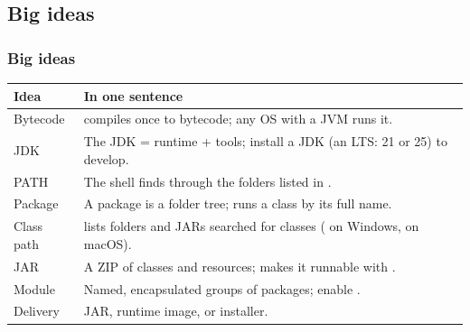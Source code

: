 \documentclass[aspectratio=169,10pt,compress]{beamer}
\begin{document}
\subsection[Ideas]{Big ideas}




\begin{frame}[t,fragile] \frametitle{Big ideas}
  \small
  \begin{tabular}{@{}L{0.22\textwidth}L{0.71\textwidth}@{}}
    \toprule
    \textbf{Idea} & \textbf{In one sentence} \\
    \midrule
    Bytecode        &  compiles once to bytecode; any OS with a JVM runs it. \\
    JDK             & The JDK = runtime + tools; install a JDK (an LTS: 21 or 25) to develop. \\
    PATH            & The shell finds  through the folders listed in . \\
    Package         & A package is a folder tree;  runs a class by its full name. \\
    Class path      &  lists folders and JARs searched for classes (\hCode{;} on Windows, \hCode{:} on macOS). \\
    JAR             & A ZIP of classes and resources;  makes it runnable with . \\
    Module          & Named, encapsulated groups of packages; enable . \\
    Delivery        & JAR,  runtime image, or  installer. \\
    \bottomrule
  \end{tabular}
\end{frame}
\end{document}
